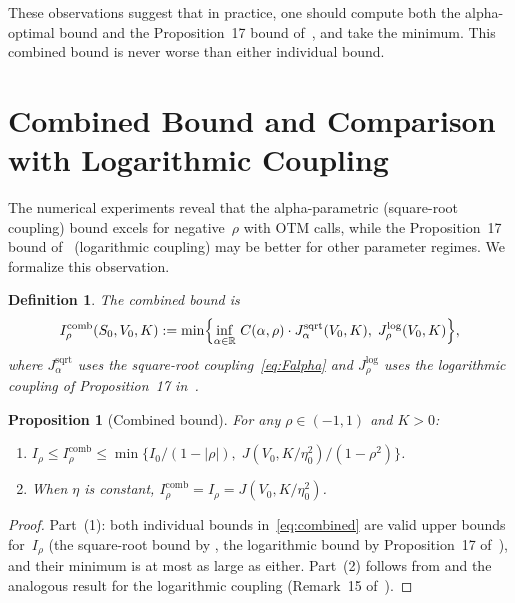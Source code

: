 \documentclass[12pt]{article}
\newtheorem{proposition}[theorem]{Proposition}
\newtheorem{definition}[theorem]{Definition}
\newcommand{\R}{\mathbb{R}}
\begin{document}
These observations suggest that in practice, one should compute both the alpha-optimal
bound and the Proposition~17 bound of~\cite{PWZ2025}, and take the minimum.
This combined bound is never worse than either individual bound.


\section{Combined Bound and Comparison with Logarithmic Coupling}\label{sec:combined}

The numerical experiments reveal that the alpha-parametric (square-root coupling) bound
excels for negative~$\rho$ with OTM calls, while the Proposition~17 bound
of~\cite{PWZ2025} (logarithmic coupling) may be better for other parameter regimes.
We formalize this observation.

\begin{definition}\label{def:combined}
The \emph{combined bound} is
\begin{equation}\label{eq:combined}
I_\rho^{\mathrm{comb}}(S_0,V_0,K) := \min\Bigl\{
  \inf_{\alpha\in\R}\,C(\alpha,\rho)\cdot J_\alpha^{\mathrm{sqrt}}(V_0,K),\;
  J_\rho^{\mathrm{log}}(V_0,K)\Bigr\},
\end{equation}
where $J_\alpha^{\mathrm{sqrt}}$ uses the square-root coupling~\eqref{eq:Falpha} and
$J_\rho^{\mathrm{log}}$ uses the logarithmic coupling of Proposition~17
in~\cite{PWZ2025}.
\end{definition}

\begin{proposition}[Combined bound]\label{prop:combined}
For any $\rho\in(-1,1)$ and $K>0$:
\begin{enumerate}
\item $I_\rho \leq I_\rho^{\mathrm{comb}} \leq
  \min\bigl\{I_0/(1-|\rho|),\; J(V_0,K/\eta_0^2)/(1-\rho^2)\bigr\}$.
\item When $\eta$ is constant, $I_\rho^{\mathrm{comb}} = I_\rho =
  J(V_0,K/\eta_0^2)$.
\end{enumerate}
\end{proposition}

\begin{proof}
Part~(1): both individual bounds in~\eqref{eq:combined} are valid upper bounds
for~$I_\rho$ (the square-root bound by , the logarithmic bound by
Proposition~17 of~\cite{PWZ2025}), and their minimum is at most as large as either.
Part~(2) follows from  and the analogous result for the logarithmic
coupling (Remark~15 of~\cite{PWZ2025}).
\end{proof}
\end{document}
